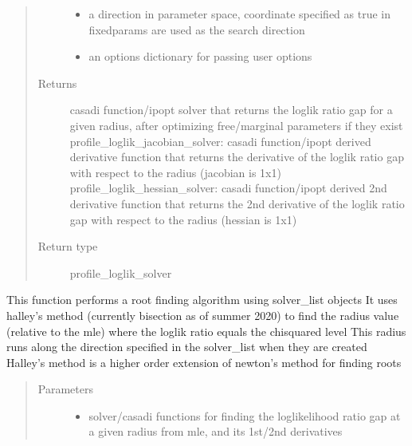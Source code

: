 \documentclass[letterpaper,10pt,english,openany,oneside]{sphinxmanual}
\begin{document}
\begin{fulllineitems}
\begin{fulllineitems}
\begin{quote}
\begin{description}
\begin{itemize}
\item {} 
 \textendash{} a direction in parameter space,  coordinate specified as true in fixedparams are used as the search direction

\item {} 
 \textendash{} an options dictionary for passing user options

\end{itemize}

\item[{Returns}] \leavevmode
casadi function/ipopt solver that returns the loglik ratio gap for a given radius,  after optimizing free/marginal parameters if they exist
profile\_loglik\_jacobian\_solver: casadi function/ipopt derived derivative function that returns the derivative of the loglik ratio gap with respect to the radius (jacobian is 1x1)
profile\_loglik\_hessian\_solver: casadi function/ipopt derived 2nd derivative function that returns the 2nd derivative of the loglik ratio gap with respect to the radius (hessian is 1x1)

\item[{Return type}] \leavevmode
profile\_loglik\_solver

\end{description}\end{quote}

\end{fulllineitems}


\begin{fulllineitems}
\label{\detokenize{nloed:nloed.model.Model.__logliksearch}}
This function performs a root finding algorithm using solver\_list objects
It uses halley’s method (currently bisection as of summer 2020) to find the radius value (relative to the mle) where the loglik ratio equals the chi\sphinxhyphen{}squared level
This radius runs along the direction specified in the solver\_list when they are created
Halley’s method is a higher order extension of newton’s method for finding roots
\begin{quote}\begin{description}
\item[{Parameters}] \leavevmode\begin{itemize}
\item {} 
 \textendash{} solver/casadi functions for finding the loglikelihood ratio gap at a given radius from mle,  and its 1st/2nd derivatives


\end{itemize}
\end{description}
\end{quote}
\end{fulllineitems}
\end{fulllineitems}
\end{document}
